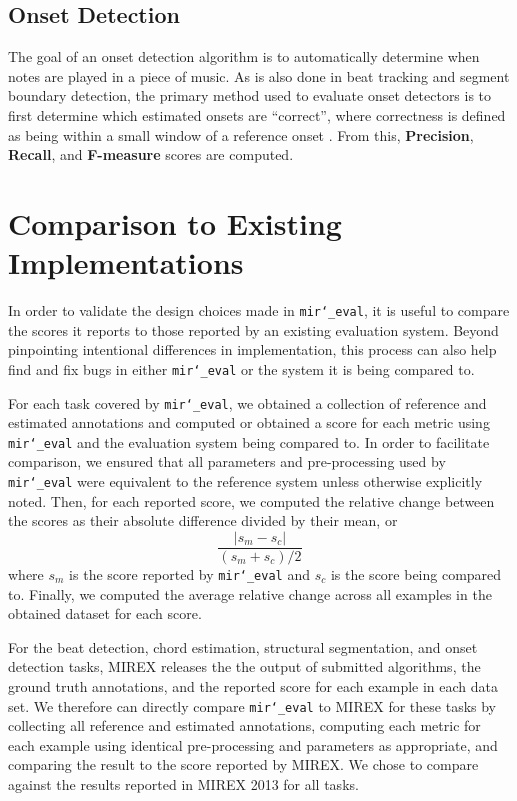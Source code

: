 \documentclass{article}
\def\mireval{\texttt{mir\char`_eval}}
\begin{document}
\subsection{Onset Detection}

The goal of an onset detection algorithm is to automatically determine when notes are played in a piece of music.
As is also done in beat tracking and segment boundary detection, the primary method used to evaluate onset detectors is to first determine which estimated onsets are ``correct'', where correctness is defined as being within a small window of a reference onset \cite{bock2012evaluating}.
From this, \textbf{Precision}, \textbf{Recall}, and \textbf{F-measure} scores are computed.

\section{Comparison to Existing Implementations}
\label{sec:comparison}

In order to validate the design choices made in \mireval{}, it is useful to compare the scores it reports to those reported by an existing evaluation system.
Beyond pinpointing intentional differences in implementation, this process can also help find and fix bugs in either \mireval{} or the system it is being compared to.

For each task covered by \mireval{}, we obtained a collection of reference and estimated annotations and computed or obtained a score for each metric using \mireval{} and the evaluation system being compared to.
In order to facilitate comparison, we ensured that all parameters and pre-processing used by \mireval{} were equivalent to the reference system unless otherwise explicitly noted.
Then, for each reported score, we computed the relative change between the scores as their absolute difference divided by their mean, or
$$
\frac{|s_m - s_c|}{(s_m + s_c)/2}
$$
where $s_m$ is the score reported by \mireval{} and $s_c$ is the score being compared to.
Finally, we computed the average relative change across all examples in the obtained dataset for each score.

For the beat detection, chord estimation, structural segmentation, and onset detection tasks, MIREX releases the the output of submitted algorithms, the ground truth annotations, and the reported score for each example in each data set.
We therefore can directly compare \mireval{} to MIREX for these tasks by collecting all reference and estimated annotations, computing each metric for each example using identical pre-processing and parameters as appropriate, and comparing the result to the score reported by MIREX.
We chose to compare against the results reported in MIREX 2013 for all tasks.
\end{document}

